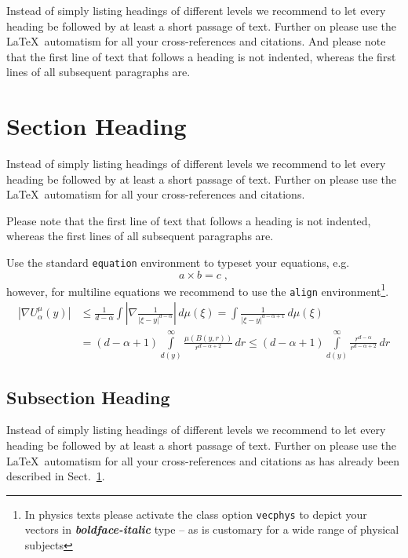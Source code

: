 \documentclass[graybox]{SNmult}
\begin{document}
Instead of simply listing headings of different levels we recommend to let every heading be followed by at least a short passage of text.  Further on please use the \LaTeX\ automatism for all your cross-references and citations. And please note that the first line of text that follows a heading is not indented, whereas the first lines of all subsequent paragraphs are.

\section{Section Heading}
\label{sec:2}
Instead of simply listing headings of different levels we recommend to let every heading be followed by at least a short passage of text.  Further on please use the \LaTeX\ automatism for all your cross-references and citations.

Please note that the first line of text that follows a heading is not indented, whereas the first lines of all subsequent paragraphs are.

Use the standard \verb|equation| environment to typeset your equations, e.g.
%
\begin{equation}
a \times b = c\;,
\end{equation}
%
however, for multiline equations we recommend to use the \verb|align| environment\footnote{In physics texts please activate the class option \texttt{vecphys} to depict your vectors in \textbf{\itshape boldface-italic} type -- as is customary for a wide range of physical subjects}.
\begin{align}
\left|\nabla U_{\alpha}^{\mu}(y)\right| &\le\frac1{d-\alpha}\int
\left|\nabla\frac1{|\xi-y|^{d-\alpha}}\right|\,d\mu(\xi) =
\int \frac1{|\xi-y|^{d-\alpha+1}} \,d\mu(\xi)  \\
&=(d-\alpha+1) \int\limits_{d(y)}^\infty
\frac{\mu(B(y,r))}{r^{d-\alpha+2}}\,dr \le (d-\alpha+1)
\int\limits_{d(y)}^\infty \frac{r^{d-\alpha}}{r^{d-\alpha+2}}\,dr
\label{eq:01}
\end{align}

\subsection{Subsection Heading}
\label{subsec:2}
Instead of simply listing headings of different levels we recommend to let every heading be followed by at least a short passage of text.  Further on please use the \LaTeX\ automatism for all your cross-references and citations as has already been described in Sect.~\ref{sec:2}.
\end{document}
